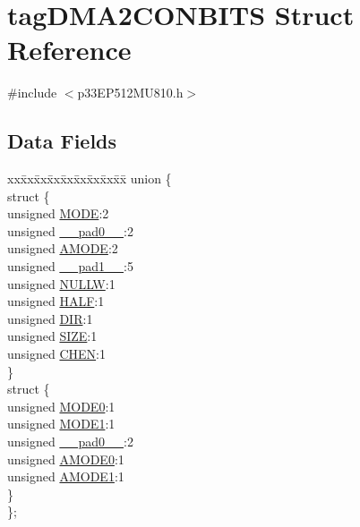 \hypertarget{structtag_d_m_a2_c_o_n_b_i_t_s}{}\section{tag\+D\+M\+A2\+C\+O\+N\+B\+I\+TS Struct Reference}
\label{structtag_d_m_a2_c_o_n_b_i_t_s}


{\ttfamily \#include $<$p33\+E\+P512\+M\+U810.\+h$>$}

\subsection*{Data Fields}
\begin{DoxyCompactItemize}
\item 
\begin{tabbing}
xx\=xx\=xx\=xx\=xx\=xx\=xx\=xx\=xx\=\kill
union \{\\
\>struct \{\\
\>\>unsigned \hyperlink{structtag_d_m_a2_c_o_n_b_i_t_s_adc56ba18ff3f1599c85d222bee624424}{MODE}:2\\
\>\>unsigned \hyperlink{structtag_d_m_a2_c_o_n_b_i_t_s_adf71f3d8410c1f1dbbc96680a92c49af}{\_\_pad0\_\_}:2\\
\>\>unsigned \hyperlink{structtag_d_m_a2_c_o_n_b_i_t_s_ab3ff4e1f1b9a1037418ca7b6cb2e8f77}{AMODE}:2\\
\>\>unsigned \hyperlink{structtag_d_m_a2_c_o_n_b_i_t_s_acaf2d0924a107ec6e8d2e31febaf66f9}{\_\_pad1\_\_}:5\\
\>\>unsigned \hyperlink{structtag_d_m_a2_c_o_n_b_i_t_s_a1d3f7d04416314131889d1671a9287ad}{NULLW}:1\\
\>\>unsigned \hyperlink{structtag_d_m_a2_c_o_n_b_i_t_s_a1a715a64b2576f59401ac93d6f9a086a}{HALF}:1\\
\>\>unsigned \hyperlink{structtag_d_m_a2_c_o_n_b_i_t_s_ad6868749602045a76f36ffdf964dfd39}{DIR}:1\\
\>\>unsigned \hyperlink{structtag_d_m_a2_c_o_n_b_i_t_s_a5863cac6dc2cb330bdd0b1c66da70ffe}{SIZE}:1\\
\>\>unsigned \hyperlink{structtag_d_m_a2_c_o_n_b_i_t_s_a092934036fdfb8df5259db288fe438ca}{CHEN}:1\\
\>\} \\
\>struct \{\\
\>\>unsigned \hyperlink{structtag_d_m_a2_c_o_n_b_i_t_s_abc938903e74bff48935569d0c5b19035}{MODE0}:1\\
\>\>unsigned \hyperlink{structtag_d_m_a2_c_o_n_b_i_t_s_a7a9f7514566d0626724ce6c4b81b5ea2}{MODE1}:1\\
\>\>unsigned \hyperlink{structtag_d_m_a2_c_o_n_b_i_t_s_adf71f3d8410c1f1dbbc96680a92c49af}{\_\_pad0\_\_}:2\\
\>\>unsigned \hyperlink{structtag_d_m_a2_c_o_n_b_i_t_s_a0a1f894a2695c1388a5412244636805b}{AMODE0}:1\\
\>\>unsigned \hyperlink{structtag_d_m_a2_c_o_n_b_i_t_s_a3fde4abc0dc3db6fef6afc28c565ce3e}{AMODE1}:1\\
\>\} \\
\}; \\


\end{tabbing}
\end{DoxyCompactItemize}
